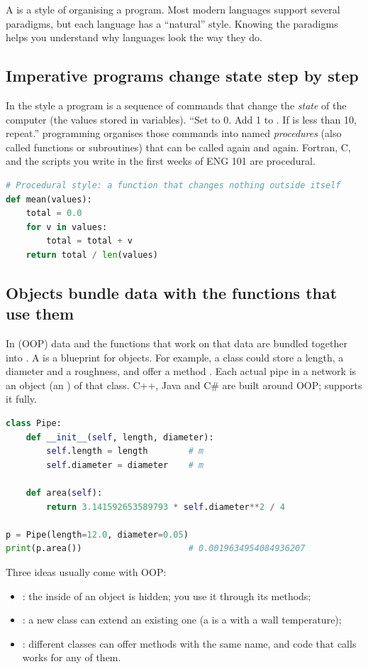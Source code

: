 A  is a style of organising a program. Most modern languages support
several paradigms, but each language has a ``natural'' style. Knowing the paradigms helps
you understand why languages look the way they do.

\subsection*{Imperative programs change state step by step}

In the  style a program is a sequence of commands that change the
\emph{state} of the computer (the values stored in variables). ``Set  to 0. Add 1
to . If  is less than 10, repeat.''  programming
organises those commands into named \emph{procedures} (also called functions or
subroutines) that can be called again and again. Fortran, C, and the scripts you write in
the first weeks of ENG 101 are procedural.
\begin{lstlisting}[language=Python]
# Procedural style: a function that changes nothing outside itself
def mean(values):
    total = 0.0
    for v in values:
        total = total + v
    return total / len(values)
\end{lstlisting}

\subsection*{Objects bundle data with the functions that use them}

In  (OOP) data and the functions that work on that data
are bundled together into . A  is a blueprint for objects. For
example, a class  could store a length, a diameter and a roughness, and offer
a method . Each actual pipe in a network is an object (an
) of that class. C++, Java and C\# are built around OOP; \py supports it
fully.
\begin{lstlisting}[language=Python]
class Pipe:
    def __init__(self, length, diameter):
        self.length = length        # m
        self.diameter = diameter    # m

    def area(self):
        return 3.141592653589793 * self.diameter**2 / 4

p = Pipe(length=12.0, diameter=0.05)
print(p.area())                     # 0.0019634954084936207
\end{lstlisting}
Three ideas usually come with OOP:
\begin{itemize}
\item {}: the inside of an object is hidden; you use it through its
  methods;
\item {}: a new class can extend an existing one (a  is
  a  with a wall temperature);
\item {}: different classes can offer methods with the same name, and
  code that calls  works for any of them.
\end{itemize}

